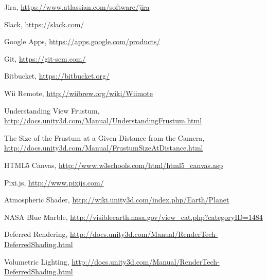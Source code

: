 \documentclass[a4paper,11pt]{article}
\begin{document}
\begin{thebibliography}{9}

	Jira,
    \url{https://www.atlassian.com/software/jira}
    
	Slack,
    \url{https://slack.com/}
    
	Google Apps,
    \url{https://apps.google.com/products/}
    
	Git,
    \url{https://git-scm.com/}
    
	Bitbucket,
    \url{https://bitbucket.org/}

  Wii Remote,
  \url{http://wiibrew.org/wiki/Wiimote}
  
  Understanding View Frustum,
  \url{http://docs.unity3d.com/Manual/UnderstandingFrustum.html}

  The Size of the Frustum at a Given Distance from the Camera,
  \url{http://docs.unity3d.com/Manual/FrustumSizeAtDistance.html}

  HTML5 Canvas,
  \url{http://www.w3schools.com/html/html5_canvas.asp}

  Pixi.js,
  \url{http://www.pixijs.com/}
  
  Atmospheric Shader,
 \url{http://wiki.unity3d.com/index.php/Earth/Planet}
  
  NASA Blue Marble,
 \url{http://visibleearth.nasa.gov/view_cat.php?categoryID=1484}
 
  Deferred Rendering,
 \url{http://docs.unity3d.com/Manual/RenderTech-DeferredShading.html}
 
  Volumetric Lighting,
 \url{http://docs.unity3d.com/Manual/RenderTech-DeferredShading.html}

\end{thebibliography}
\end{document}
